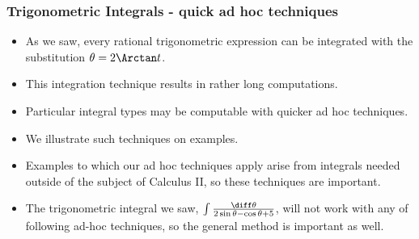 \begin{frame}
\frametitle{Trigonometric Integrals - quick ad hoc techniques}
\begin{itemize}
\item As we saw, every rational trigonometric expression can be integrated with the substitution $\theta=2\Arctan t$.
\item<2-> This integration technique results in rather long computations. 
\item<3-> Particular integral types may be computable with quicker ad hoc techniques.
\item<4-> We illustrate such techniques on examples. 
\item<5-> Examples to which our ad hoc techniques apply arise from integrals needed outside of the subject of Calculus II, so these techniques are important.
\item<6-> The trigonometric integral we saw, $\int \frac{\diff \theta}{2\sin \theta -\cos\theta+5}$, will not work with any of following ad-hoc techniques, so the general method is important as well.
\end{itemize}
\end{frame}


